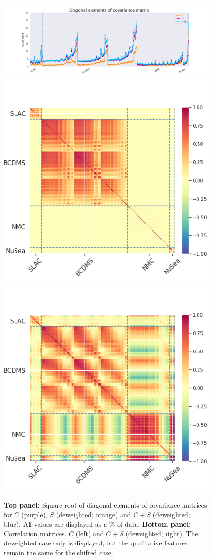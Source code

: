 \begin{figure}[h]
  \begin{center}
      \includegraphics[width=\linewidth, trim={4cm 0 4cm 0}]{nuclear/plots/diag_covmat_ite_1.png}
    \includegraphics[width=0.45\linewidth]{nuclear/plots/covmats_experiment_global_proton.png}
        \includegraphics[width=0.45\linewidth]{nuclear/plots/covmats_total_global_proton.png}
    \caption{\textbf{Top panel:} Square root of diagonal elements of covariance matrices for $C$ (purple), $S$ (deweighted; orange) and $C+S$ (deweighted; blue). All values are displayed as a \% of data. \textbf{Bottom panel: }Correlation matrices. $C$ (left) and $C+S$ (deweighted; right). The deweighted case only is displayed, but the qualitative features remain the same for the shifted case.
    \label{fig:deutcov} }
    \end{center}
\end{figure}   

